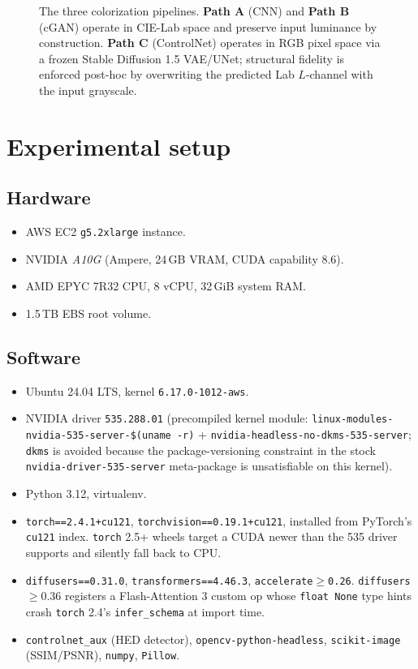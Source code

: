 \documentclass[conference]{IEEEtran}
\begin{document}
\begin{figure}[!t]
\begin{tikzpicture}
\end{tikzpicture}
\caption{The three colorization pipelines. \textbf{Path A} (CNN) and
\textbf{Path B} (cGAN) operate in CIE-Lab space and preserve input
luminance by construction. \textbf{Path C} (ControlNet) operates in
RGB pixel space via a frozen Stable Diffusion 1.5 VAE/UNet; structural
fidelity is enforced post-hoc by overwriting the predicted Lab
$L$-channel with the input grayscale.}
\label{fig:pipelines}
\end{figure}

\section{Experimental setup}\label{sec:setup}

\subsection{Hardware}
\begin{itemize}
  \item AWS EC2 \texttt{g5.2xlarge} instance.
  \item NVIDIA \emph{A10G} (Ampere, 24\,GB VRAM, CUDA capability 8.6).
  \item AMD EPYC 7R32 CPU, 8 vCPU, 32\,GiB system RAM.
  \item 1.5\,TB EBS root volume.
\end{itemize}

\subsection{Software}
\begin{itemize}
  \item Ubuntu 24.04 LTS, kernel \texttt{6.17.0-1012-aws}.
  \item NVIDIA driver \texttt{535.288.01} (precompiled kernel module:
        \texttt{linux-modules-nvidia-535-server-\$(uname -r)} +
        \texttt{nvidia-headless-no-dkms-535-server}; \texttt{dkms} is
        avoided because the package-versioning constraint in the
        stock \texttt{nvidia-driver-535-server} meta-package is
        unsatisfiable on this kernel).
  \item Python 3.12, virtualenv.
  \item \texttt{torch==2.4.1+cu121}, \texttt{torchvision==0.19.1+cu121},
        installed from PyTorch's \texttt{cu121} index. \texttt{torch}
        2.5+ wheels target a CUDA newer than the 535 driver supports
        and silently fall back to CPU.
  \item \texttt{diffusers==0.31.0}, \texttt{transformers==4.46.3},
        \texttt{accelerate$\ge$0.26}. \texttt{diffusers}$\ge$0.36
        registers a Flash-Attention 3 custom op whose
        \texttt{float \textbar{} None} type hints crash
        \texttt{torch} 2.4's \texttt{infer\_schema} at import time.
  \item \texttt{controlnet\_aux} (HED detector),
        \texttt{opencv-python-headless}, \texttt{scikit-image}
        (SSIM/PSNR), \texttt{numpy}, \texttt{Pillow}.
\end{itemize}
\end{document}
